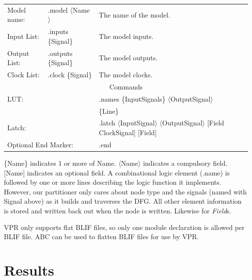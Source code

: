 \documentclass[12pt,final,oneside]{dwThesis} %
\begin{document}
   \begin{tabular}
      {lll} Model name: & .model $\langle$Name$\rangle$ & The name
      of the model.\\
      Input List: & .inputs \{Signal\} & The model inputs.\\

      Output List:& .outputs \{Signal\} & The model outputs.\\
      Clock List: &
      .clock \{Signal\} & The model clocks.\\
      \multicolumn{3}{c}{Commands}\\

      \multicolumn{2}{l}{\gls{LUT}:} & .names \{InputSignals\}
      $\langle$OutputSignal$\rangle$\\
      &&\{Line\}\\
      \multicolumn{2}{l}{Latch:}
      & .latch $\langle$InputSignal$\rangle$ $\langle$OutputSignal$\rangle$
      [Field ClockSignal] [Field]\\
      \multicolumn{2}{l}{Optional End Marker:} &
      .end 
   \end{tabular}


   \{Name\} indicates 1 or more of Name. $\langle$Name$\rangle$ indicates a
   compulsory field. [Name] indicates an optional field.  A combinational logic
   element (.name) is followed by one or more lines describing the logic
   function it implements. However, our partitioner only cares about node type
   and the signals (named with Signal above) as it builds and traverses the
   \gls{DFG}. All other element information is stored and written back out when
   the node is written. Likewise for \textit{Field}s.

   \gls{VPR} only supports flat \gls{BLIF} files, so only one module
   declaration is allowed per \gls{BLIF} file. \gls{ABC} can be used to flatten
   \gls{BLIF} files for use by \gls{VPR}.


   \chapter{Results}
\end{document}
